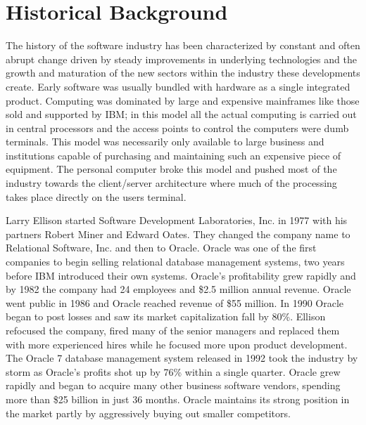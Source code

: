 \section*{Historical Background}

The history of the software industry has been characterized by constant and often abrupt change driven by steady improvements in underlying technologies and the growth and maturation of the new sectors within the industry these developments create. Early software was usually bundled with hardware as a single integrated product.\autocite[4]{buxmann2012software} Computing was dominated by large and expensive mainframes like those sold and supported by IBM; in this model all the actual computing is carried out in central processors and the access points to control the computers were dumb terminals.\autocite[]{LargeParadigmShiftCloudComputing}
This model was necessarily only available to large business and institutions capable of purchasing and maintaining such an expensive piece of equipment.
The personal computer broke this model and pushed most of the industry towards the client/server architecture where much of the processing takes place directly on the users terminal.\autocite[]{LargeParadigmShiftCloudComputing}


Larry Ellison started Software Development Laboratories, Inc. in 1977 with his partners Robert Miner and Edward Oates.\autocite[113]{finkle2012larry}
They changed the company name to Relational Software, Inc. and then to Oracle.\autocite[113]{finkle2012larry}
Oracle was one of the first companies to begin selling relational database management systems, two years before IBM introduced their own systems.\autocite[113]{finkle2012larry}
Oracle's profitability grew rapidly and by 1982 the company had 24 employees and \$2.5 million annual revenue.\autocite[113]{finkle2012larry}
Oracle went public in 1986 and Oracle reached revenue of \$55 million.\autocite[113]{finkle2012larry}
In 1990 Oracle began to post losses and saw its market capitalization fall by 80\%.\autocite[113]{finkle2012larry}
Ellison refocused the company, fired many of the senior managers and replaced them with more experienced hires while he focused more upon product development.\autocite[113]{finkle2012larry}
The Oracle 7 database management system released in 1992 took the industry by storm as Oracle's profits shot up by 76\% within a single quarter.\autocite[114]{finkle2012larry}
Oracle grew rapidly and began to acquire many other business software vendors, spending more than \$25 billion in just 36 months.\autocite[114]{finkle2012larry}
Oracle maintains its strong position in the market partly by aggressively buying out smaller competitors.\autocite[]{finkle2012larry}

